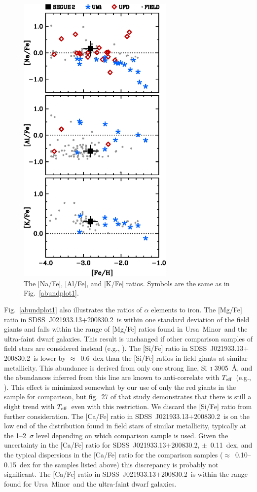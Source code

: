 \documentclass[useAMS,usenatbib,usegraphicx]{mn2e}
\def\teff{\mbox{$T_{\rm eff}$}}
\def\seg{\mbox{SDSS~J021933.13$+$200830.2}}
\def\umigal{\mbox{Ursa Minor}}
\begin{document}
\begin{figure}
\centering
\includegraphics[angle=00,width=3.0in]{fig4.eps}
\caption{
\label{abundplot2}
The [Na/Fe], [Al/Fe], and [K/Fe] ratios.
Symbols are the same as in Fig.~\ref{abundplot1}.
}
\end{figure}


Fig.~\ref{abundplot1} also illustrates the ratios of
$\alpha$ elements to iron.
The [Mg/Fe] ratio in \seg\ 
is within one standard deviation of the field giants
and falls within the range of [Mg/Fe] ratios found
in \umigal\ and the ultra-faint dwarf galaxies.
This result is unchanged if other comparison samples of
field stars are considered instead
(e.g., \citealt{cayrel04,honda04,lai08,yong13,cohen13}).
The [Si/Fe] ratio in \seg\ is lower by $\approx$~0.6~dex than the
[Si/Fe] ratios in field giants at similar metallicity.
This abundance is derived from only one strong line,
Si~\textsc{i} 3905~\AA, and the abundances inferred from this line 
are known to anti-correlate with \teff\
(e.g., \citealt{preston06}).
This effect is minimized somewhat by our use of only the
red giants in the \citet{roederer14} sample for comparison,
but fig.~27 of that study demonstrates that there is still a
slight trend with \teff\ even with this restriction.
We discard the [Si/Fe] ratio from further consideration.
The [Ca/Fe] ratio in \seg\ is on the low end of the
distribution found in field stars of similar metallicity,
typically at the 1--2~$\sigma$ level depending on which
comparison sample is used.
Given the uncertainty in the [Ca/Fe] ratio for \seg, $\pm$~0.11~dex,
and the typical dispersions in the [Ca/Fe] ratio for
the comparison samples ($\approx$~0.10--0.15~dex for the
samples listed above)
this discrepancy is probably not significant.
The [Ca/Fe] ratio in \seg\ is within the range found for
\umigal\ and the ultra-faint dwarf galaxies.
\end{document}
